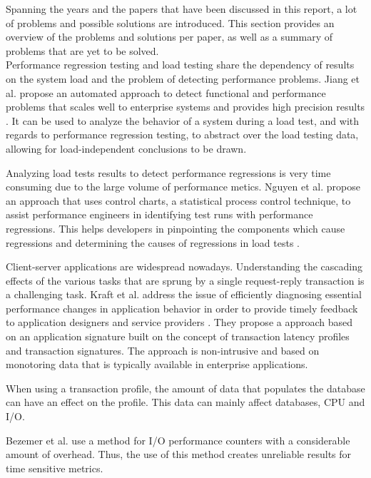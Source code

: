 Spanning the years and the papers that have been discussed in this report, a lot of problems and possible solutions are introduced. This section provides an overview of the problems and solutions per paper, as well as a summary of problems that are yet to be solved.\\

Performance regression testing and load testing share the dependency of results on the system load and the problem of detecting performance problems. Jiang et al. propose an automated approach to detect functional and performance problems that scales well to enterprise systems and provides high precision results \cite{jiang2010automated}. It can be used to analyze the behavior of a system during a load test, and with regards to performance regression testing, to abstract over the load testing data, allowing for load-independent conclusions to be drawn.

Analyzing load tests results to detect performance regressions is
very time consuming due to the large volume of performance
metics. Nguyen et al. propose an approach that uses control charts, a statistical process control technique, to assist performance engineers in identifying test runs with performance regressions. This helps developers in pinpointing the components which cause regressions and determining the causes of regressions in load tests \cite{nguyen2012using}.

Client-server applications are widespread nowadays. Understanding the cascading effects of the various tasks that are sprung by a single request-reply transaction is a challenging task. Kraft et al. address the issue of efficiently diagnosing essential performance changes in application behavior in order to provide timely feedback to application designers and service providers \cite{kraft2009estimating}. They propose a approach based on an application signature built on the concept of transaction latency profiles and transaction signatures. The approach is non-intrusive and based on monotoring data that is typically available in enterprise applications.

When using a transaction profile, the amount of data that populates the database can have an effect on the profile. This data can mainly affect databases, CPU and I/O. \cite{ghaith2015anomaly}

Bezemer et al. use a method for I/O performance counters with a considerable amount of overhead. Thus, the use of this method creates unreliable results for time sensitive metrics\cite{bezemer2014detecting}.

